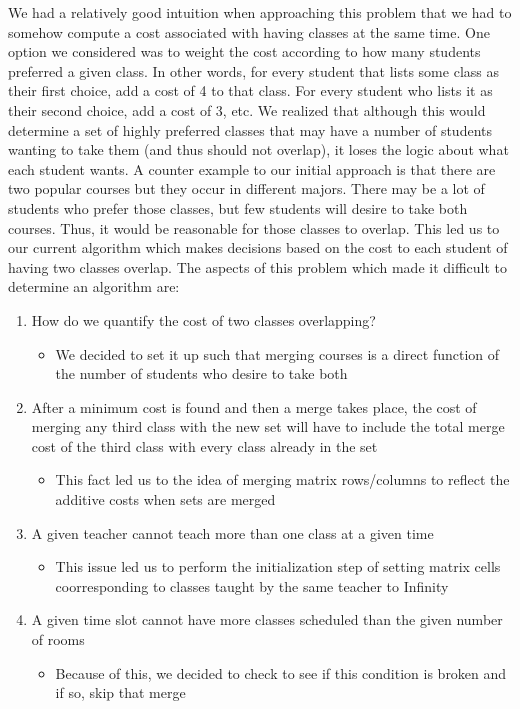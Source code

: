 \documentclass[11pt, oneside]{article}   	%
\begin{document}
We had a relatively good intuition when approaching this problem that we had to somehow compute a cost associated with having classes at the same time. One option we considered was to weight the cost according to how many students preferred a given class. In other words, for every student that lists some class as their first choice, add a cost of 4 to that class. For every student who lists it as their second choice, add a cost of 3, etc. We realized that although this would determine a set of highly preferred classes that may have a number of students wanting to take them (and thus should not overlap), it loses the logic about what each student wants. A counter example to our initial approach is that there are two popular courses but they occur in different majors. There may be a lot of students who prefer those classes, but few students will desire to take both courses. Thus, it would be reasonable for those classes to overlap. This led us to our current algorithm which makes decisions based on the cost to each student of having two classes overlap. The aspects of this problem which made it difficult to determine an algorithm are:
\begin{enumerate}
\item{How do we quantify the cost of two classes overlapping?}
\begin{itemize}
\item{We decided to set it up such that merging courses is a direct function of the number of students who desire to take both}
\end{itemize}
\item{After a minimum cost is found and then a merge takes place, the cost of merging any third class with the new set will have to include the total merge cost of the third class with every class already in the set} 
\begin{itemize}
\item{This fact led us to the idea of merging matrix rows/columns to reflect the additive costs when sets are merged}
\end{itemize}
\item{A given teacher cannot teach more than one class at a given time}
\begin{itemize}
\item{This issue led us to perform the initialization step of setting matrix cells coorresponding to classes taught by the same teacher to Infinity}
\end{itemize}
\item{A given time slot cannot have more classes scheduled than the given number of rooms}
\begin{itemize}
\item{Because of this, we decided to check to see if this condition is broken and if so, skip that merge}
\end{itemize}
\end{enumerate}
\end{document}
